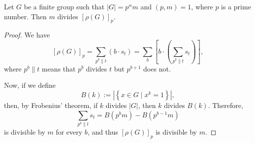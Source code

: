 \documentclass[10pt,a4paper]{amsart}
\begin{document}
	\begin{lemma} \label{bhamed}  
		Let $G$ be a finite group such that $|G|=p^{\alpha}m$ and  $(p,m)=1$, where $p$ is a  prime  number. Then
		$m $ divides $ [\rho(G)]_p$.
	\end{lemma}

\begin{proof}
	We have
	\[
	[\rho(G)]_p = \sum_{p^b \parallel t} \left(b \cdot s_t\right) = \sum_b \left[b \cdot \left(\sum_{p^b \parallel t} s_t\right)\right],
	\]
	where \textbf{$p^b \parallel t$} means that $p^b$ divides $t$ but $p^{b+1}$ does not.
	
	Now, if we define
	\[
	B(k) := \left|\left\{x \in G \mid x^k = 1\right\}\right|,
	\]
	then, by Frobenius' theorem, if $k$ divides $|G|$, then $k$ divides $B(k)$. Therefore,
	\[
	\sum_{p^b \parallel t} s_t = B\left(p^b m\right) - B\left(p^{b-1} m\right)
	\]
	is divisible by $m$ for every $b$, and thus $[\rho(G)]_p$ is divisible by $m$.
\end{proof}
\end{document}
